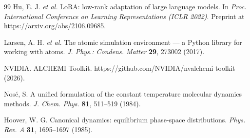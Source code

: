 \documentclass[11pt]{article}
\begin{document}
\begin{thebibliography}{99}
Hu, E. J. \emph{et al.} LoRA: low-rank adaptation of large language models. In
\emph{Proc. International Conference on Learning Representations (ICLR 2022)}.
Preprint at https://arxiv.org/abs/2106.09685.

Larsen, A. H. \emph{et al.} The atomic simulation environment --- a Python
library for working with atoms. \emph{J. Phys.: Condens. Matter} \textbf{29},
273002 (2017).

NVIDIA. ALCHEMI Toolkit. https://github.com/NVIDIA/nvalchemi-toolkit (2026).

Nos\'e, S. A unified formulation of the constant temperature molecular dynamics
methods. \emph{J. Chem. Phys.} \textbf{81}, 511--519 (1984).

Hoover, W. G. Canonical dynamics: equilibrium phase-space distributions.
\emph{Phys. Rev. A} \textbf{31}, 1695--1697 (1985).

\end{thebibliography}
\end{document}
